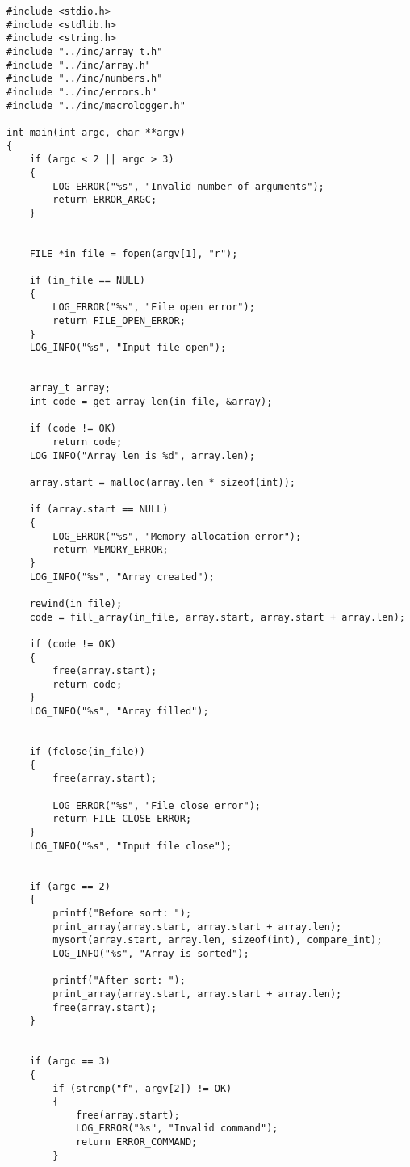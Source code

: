 \begin{center}
    \captionsetup{justification=raggedright,singlelinecheck=off}
    \begin{lstlisting}[label=lst:main,caption=main.c]
#include <stdio.h>
#include <stdlib.h>
#include <string.h>
#include "../inc/array_t.h"
#include "../inc/array.h"
#include "../inc/numbers.h"
#include "../inc/errors.h"
#include "../inc/macrologger.h"

int main(int argc, char **argv)
{
    if (argc < 2 || argc > 3)
    {
        LOG_ERROR("%s", "Invalid number of arguments");
        return ERROR_ARGC;
    }


    FILE *in_file = fopen(argv[1], "r");

    if (in_file == NULL)
    {
        LOG_ERROR("%s", "File open error");
        return FILE_OPEN_ERROR;
    }
    LOG_INFO("%s", "Input file open");


    array_t array;
    int code = get_array_len(in_file, &array);
    
    if (code != OK)
        return code;
    LOG_INFO("Array len is %d", array.len);

    array.start = malloc(array.len * sizeof(int));
         
    if (array.start == NULL)
    {
        LOG_ERROR("%s", "Memory allocation error");
        return MEMORY_ERROR;
    }
    LOG_INFO("%s", "Array created");

    rewind(in_file);
    code = fill_array(in_file, array.start, array.start + array.len);

    if (code != OK)
    {
        free(array.start);
        return code;
    }
    LOG_INFO("%s", "Array filled");


    if (fclose(in_file))
    {
        free(array.start);

        LOG_ERROR("%s", "File close error");
        return FILE_CLOSE_ERROR;
    }
    LOG_INFO("%s", "Input file close");


    if (argc == 2)
    {
        printf("Before sort: ");
        print_array(array.start, array.start + array.len);
        mysort(array.start, array.len, sizeof(int), compare_int);
        LOG_INFO("%s", "Array is sorted");

        printf("After sort: ");
        print_array(array.start, array.start + array.len);
        free(array.start);
    }


    if (argc == 3)
    {
        if (strcmp("f", argv[2]) != OK)
        {
            free(array.start);
            LOG_ERROR("%s", "Invalid command");
            return ERROR_COMMAND;
        }



\end{lstlisting}
\end{center}
